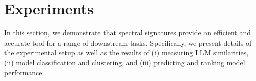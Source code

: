 \section{Experiments}\label{sec:results}

In this section, we demonstrate that spectral signatures provide an efficient and accurate tool for a range of downstream tasks. Specifically, we present details of the experimental setup as well as the results of (i) measuring LLM similarities, (ii) model classification and clustering, and (iii) predicting and ranking model performance. 



